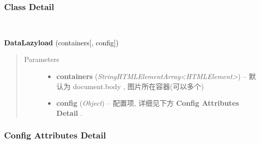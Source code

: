 \documentclass[letterpaper,10pt,english]{sphinxmanual}
\begin{document}
\subsubsection{Class Detail}
\label{api/component/datalazyload/index:class-detail}

\begin{fulllineitems}
\label{api/component/datalazyload/index:DataLazyload.DataLazyload}~
\begin{DUlineblock}{0em}
\item[] \textbf{DataLazyload} (containers{[}, config{]})
\end{DUlineblock}
\begin{quote}\begin{description}
\item[{Parameters}] \leavevmode\begin{itemize}
\item {}
\textbf{containers} (\emph{String\textbar{}HTMLElement\textbar{}Array\textless{}HTMLElement\textgreater{}}) -- 默认为 document.body , 图片所在容器(可以多个)

\item {}
\textbf{config} (\emph{Object}) -- 配置项, 详细见下方 \textbf{Config Attributes Detail} .

\end{itemize}

\end{description}\end{quote}

\end{fulllineitems}



\subsubsection{Config Attributes Detail}
\label{api/component/datalazyload/index:config-attributes-detail}
\end{document}
